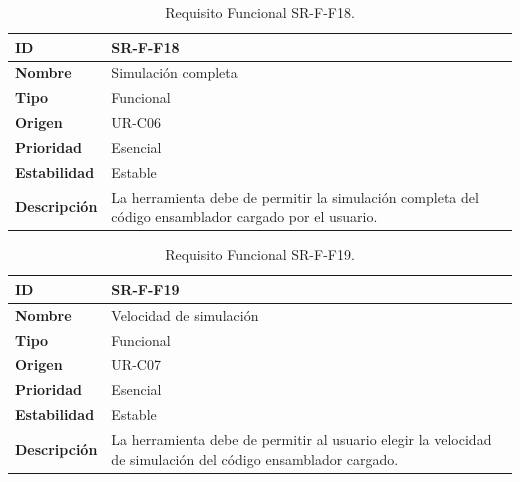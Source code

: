\begin{center}
\begin{table}[htbp]
\centering
\begin{tabular}{@{}p{2.5cm} p{9cm}@{}} 
\toprule
\textbf{ID} 				& SR-F-F18 \\
\midrule
\textbf{Nombre} 			& Simulación completa\\
\midrule
\textbf{Tipo} 			& Funcional \\
\midrule
\textbf{Origen} 			& UR-C06 \\
\midrule
\textbf{Prioridad}		& Esencial \\
\midrule
\textbf{Estabilidad} 		& Estable \\
\midrule
\textbf{Descripción} 	& La herramienta debe de permitir la simulación completa del código ensamblador cargado por el usuario. \\
\bottomrule
\end{tabular}
\caption{Requisito Funcional SR-F-F18.}
\label{tab:srff18}
\end{table}
\end{center}

\begin{center}
\begin{table}[htbp]
\centering
\begin{tabular}{@{}p{2.5cm} p{9cm}@{}} 
\toprule
\textbf{ID} 				& SR-F-F19 \\
\midrule
\textbf{Nombre} 			& Velocidad de simulación\\
\midrule
\textbf{Tipo} 			& Funcional \\
\midrule
\textbf{Origen} 			& UR-C07 \\
\midrule
\textbf{Prioridad}		& Esencial \\
\midrule
\textbf{Estabilidad} 		& Estable \\
\midrule
\textbf{Descripción} 	& La herramienta debe de permitir al usuario elegir la velocidad de simulación del código ensamblador cargado. \\
\bottomrule
\end{tabular}
\caption{Requisito Funcional SR-F-F19.}
\label{tab:srff19}
\end{table}
\end{center}

